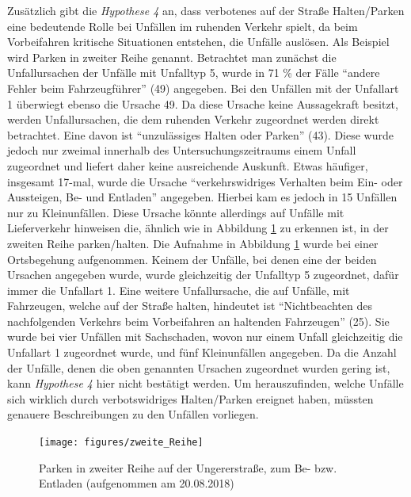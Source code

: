 Zusätzlich gibt die \textit{Hypothese 4} an, dass verbotenes auf der Straße Halten/Parken eine bedeutende Rolle bei Unfällen im ruhenden Verkehr spielt, da beim Vorbeifahren kritische Situationen entstehen, die Unfälle auslösen. Als Beispiel wird Parken in zweiter Reihe genannt. Betrachtet man zunächst die Unfallursachen der Unfälle mit Unfalltyp 5, wurde in 71 \% der Fälle \enquote{andere Fehler beim Fahrzeugführer} (49) angegeben. Bei den Unfällen mit der Unfallart 1 überwiegt ebenso die Ursache 49. Da diese Ursache keine Aussagekraft besitzt, werden Unfallursachen, die dem ruhenden Verkehr zugeordnet werden direkt betrachtet. Eine davon ist \enquote{unzulässiges Halten oder Parken} (43). Diese wurde jedoch nur zweimal innerhalb des Untersuchungszeitraums einem Unfall zugeordnet und liefert daher keine ausreichende Auskunft. Etwas häufiger, insgesamt 17-mal, wurde die Ursache \enquote{verkehrswidriges Verhalten beim Ein- oder Aussteigen, Be- und Entladen} angegeben. Hierbei kam es jedoch in 15 Unfällen nur zu Kleinunfällen. Diese Ursache könnte allerdings auf Unfälle mit Lieferverkehr hinweisen die, ähnlich wie in Abbildung \ref{fig:Parken_zweite_Reihe} zu erkennen ist, in der zweiten Reihe parken/halten. Die Aufnahme in Abbildung \ref{fig:Parken_zweite_Reihe} wurde bei einer Ortsbegehung aufgenommen. Keinem der Unfälle, bei denen eine der beiden Ursachen angegeben wurde, wurde gleichzeitig der Unfalltyp 5 zugeordnet, dafür immer die Unfallart 1. Eine weitere Unfallursache, die auf Unfälle, mit Fahrzeugen, welche auf der Straße halten, hindeutet ist \enquote{Nichtbeachten des nachfolgenden Verkehrs beim Vorbeifahren an haltenden Fahrzeugen} (25). Sie wurde bei vier Unfällen mit Sachschaden, wovon nur einem Unfall gleichzeitig die Unfallart 1 zugeordnet wurde, und fünf Kleinunfällen angegeben. Da die Anzahl der Unfälle, denen die oben genannten Ursachen zugeordnet wurden gering ist, kann \textit{Hypothese 4} hier nicht bestätigt werden. Um herauszufinden, welche Unfälle sich wirklich durch verbotswidriges Halten/Parken ereignet haben, müssten genauere Beschreibungen zu den Unfällen vorliegen. %

\begin{savenotes}
	\begin{figure}[H]
		\centering
		\texttt{[image: figures/zweite\_Reihe]}
		\caption[Parken in zweiter Reihe auf der Ungererstraße, zum Be- bzw. Entladen]{Parken in zweiter Reihe auf der Ungererstraße, zum Be- bzw. Entladen (aufgenommen am 20.08.2018)}\label{fig:Parken_zweite_Reihe}
	\end{figure}
\end{savenotes}

